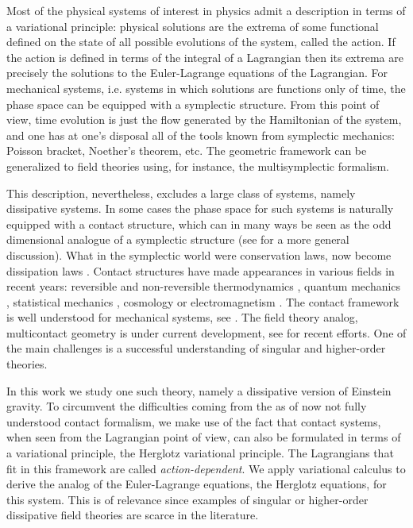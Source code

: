 \documentclass[../main.tex]{subfiles}
\begin{document}
Most of the physical systems of interest in physics admit a description in terms of a
variational principle: physical solutions are the extrema of some functional defined on
the state of all possible evolutions of the system, called the action. If the action is
defined in terms of the integral of a Lagrangian then its extrema are precisely the
solutions to the Euler-Lagrange equations of the Lagrangian. For mechanical systems, i.e.
systems in which solutions are functions only of time, the phase space can be equipped
with a symplectic structure. From this point of view, time evolution is just the flow
generated by the Hamiltonian of the system, and one has at one's disposal all of the tools
known from symplectic mechanics: Poisson bracket, Noether's theorem, etc. The geometric
framework can be generalized to field theories using, for instance, the multisymplectic
formalism.

This description, nevertheless, excludes a large class of systems, namely dissipative
systems. In some cases the phase space for such systems is naturally equipped with a
contact structure, which can in many ways be seen as the odd dimensional analogue of a
symplectic structure (see \cite{grabowska_geometric_2022} for a more general discussion).
What in the symplectic world were conservation laws, now become dissipation laws
\cite{Gaset2020b}. Contact structures have made appearances in various fields in recent
years: reversible and non-reversible thermodynamics
\cite{Bravetti2019,Mrugala1991,Simoes2020}, quantum mechanics \cite{ciaglia_contact_2018},
statistical mechanics \cite{goto_contact_2016}, cosmology \cite{Lazo2017,Sloan} or
electromagnetism \cite{GasetMarin}. The contact framework is well understood for
mechanical systems, see
\cite{Gaset2020b,geiges_introduction_2008,Lainz2019,Leon2021,Leon2019,Leon2021a,cocontact}.
The field theory analog, multicontact geometry is under current development, see
\cite{Gaset2020, Gaset2020a,Georgieva, de_leon_multicontact_2022} for recent efforts. One
of the main challenges is a successful understanding of singular and higher-order
theories.

In this work we study one such theory, namely a dissipative version of Einstein gravity.
To circumvent the difficulties coming from the as of now not fully understood contact
formalism, we make use of the fact that contact systems, when seen from the Lagrangian
point of view, can also be formulated in terms of a variational principle, the Herglotz
variational principle. The Lagrangians that fit in this framework are called
\emph{action-dependent}. We apply variational calculus to derive the analog of the
Euler-Lagrange equations, the Herglotz equations, for this system. This is of relevance
since examples of singular or higher-order dissipative field theories are scarce in the
literature. 
\end{document}
